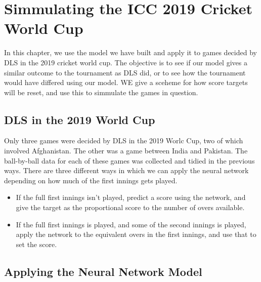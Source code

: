 \chapter{Simmulating the ICC 2019 Cricket World Cup}
In this chapter, we use the model we have built and apply it to games decided by DLS in the 2019 cricket world cup. The objective is to see if our model 
gives a similar outcome to the tournament as DLS did, or to see how the tournament would have differed using our model. WE give a sceheme for how score targets will
be reset, and use this to simmulate the games in question. 

\section{DLS in the 2019 World Cup}
Only three games were decided by DLS in the 2019 Worlc Cup, two of which involved Afghanistan. The other was a game between India and Pakistan. The ball-by-ball data for 
each of these games was collected and tidied in the previous ways. There are three different ways in which we can apply the neural network depending on how much of the first innings gets played.

\begin{itemize}
    \item If the full first innings isn't played, predict a score using the network, and give the target as the proportional score to the number of overs available. 
    \item If the full first innings is played, and some of the second innings is played, apply the network to the equivalent overs in the first innings, and use that to set the score. 
\end{itemize}


\section{Applying the Neural Network Model}
